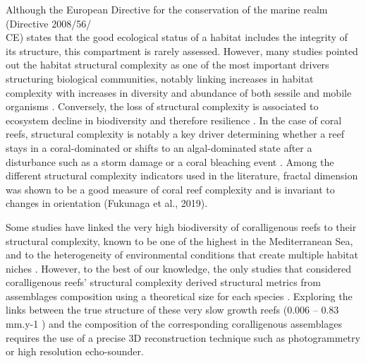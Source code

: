 Although the European Directive for the conservation of the marine realm (Directive 2008/56/\\CE) states that the good ecological status of a habitat includes the integrity of its structure, this compartment is rarely assessed. However, many studies pointed out the habitat structural complexity as one of the most important drivers structuring biological communities, notably linking increases in habitat complexity with increases in diversity and abundance of both sessile and mobile organisms \citep{darling_relationships_2017, graham_importance_2013, gratwicke_relationship_2005, harborne_biotic_2011, kovalenko_habitat_2012, luckhurst_analysis_1978, meager_topographic_2011, rees_abiotic_2014}. Conversely, the loss of structural complexity is associated to ecosystem decline in biodiversity and therefore resilience \citep{ferrari_quantifying_2016}. In the case of coral reefs, structural complexity is notably a key driver determining whether a reef stays in a coral-dominated or shifts to an algal-dominated state after a disturbance such as a storm damage or a coral bleaching event \citep{graham_predicting_2015}. Among the different structural complexity indicators used in the literature, fractal dimension was shown to be a good measure of coral reef complexity and is invariant to changes in orientation (Fukunaga et al., 2019).

Some studies have linked the very high biodiversity of coralligenous reefs to their structural complexity, known to be one of the highest in the Mediterranean Sea, and to the heterogeneity of environmental conditions that create multiple habitat niches \citep{johnson_area-independent_2003, kipson_rapid_2011, willis_habitat_2005}. However, to the best of our knowledge, the only studies that considered coralligenous reefs’ structural complexity derived structural metrics from assemblages composition using a theoretical size for each species \citep{sartoretto_integrated_2017, valisano_characterization_2019}. Exploring the links between the true structure of these very slow growth reefs (0.006 – 0.83 mm.y-1 \citep{sartoretto_age_1996}) and the composition of the corresponding coralligenous assemblages requires the use of a precise 3D reconstruction technique such as photogrammetry or high resolution echo-sounder.

